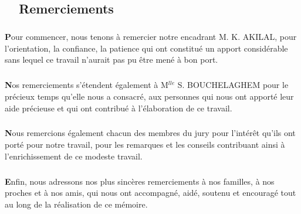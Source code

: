 \begin{titlepage}
\newpage
\pagestyle{fancy}      
\lhead{}  
\chead{}     
\rhead{}     
    
\renewcommand{\headrulewidth}{0.5pt}

\chapter*{\hrulefill ~~\textbf{Remerciements}~ \hrulefill}
\paragraph{}
\paragraph{}
\large

	  \textbf{P}our commencer, nous tenons \`a remercier notre encadrant M. K. AKILAL, pour l'orientation, la confiance, la patience qui ont constitu\'e un apport consid\'erable sans lequel ce travail n'aurait pas pu \^etre men\'e \`a bon port. 
		
		\paragraph{}
			
		\textbf{N}os remerciements s'\'etendent \'egalement \`a M$^{lle}$ S. BOUCHELAGHEM pour le pr\'ecieux temps qu'elle nous a consacr\'e, aux personnes qui nous ont apport\'e leur aide pr\'ecieuse et qui ont contribu\'e \`a l'\'elaboration de ce travail.
		
		\paragraph{}
		
		\textbf{N}ous remercions \'egalement chacun des membres du jury pour l'int\'er\^et qu'ils ont port\'e pour notre travail, pour les remarques et les conseils contribuant ainsi \`a l'enrichissement de ce modeste travail.
		
		\paragraph{}
		\textbf{E}nfin, nous adressons nos plus sinc\`eres remerciements \`a nos familles, \`a nos proches et \`a nos amis, qui nous ont accompagn\'e, aid\'e, soutenu et encourag\'e tout au long de la r\'ealisation de ce m\'emoire. 
		
		\paragraph{}
		
		
		
		\paragraph{}
		


\thispagestyle{empty}		

\end{titlepage}	